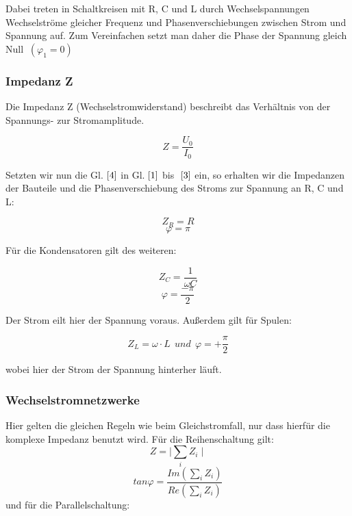 \documentclass{article}
\begin{document}
Dabei treten in Schaltkreisen mit R, C und L durch Wechselspannungen Wechselströme gleicher Frequenz und Phasenverschiebungen zwischen Strom und Spannung auf. Zum Vereinfachen setzt man daher die Phase der Spannung gleich Null \(\ (\varphi _{1}=0)\) \\

\subsubsection{Impedanz Z}
Die Impedanz Z (Wechselstromwiderstand) beschreibt das Verhältnis von der Spannungs- zur Stromamplitude.

\begin{equation}
\label{5}
Z=\frac{U_{0}}{I_{0}}
\end{equation}

Setzten wir nun die Gl.\(\ \eqref{4}\) in Gl.\(\ \eqref{1}\) bis \(\ \eqref{3}\) ein, so erhalten wir die Impedanzen der Bauteile und die Phasenverschiebung des Stroms zur Spannung an R, C und L:

\begin{equation}
Z_{R}=R
\end{equation}
\begin{equation}
\varphi = \pi
\end{equation}

Für die Kondensatoren gilt des weiteren:

\begin{equation}
Z_{C}=\frac{1}{\omega C}
\end{equation}
\begin{equation}
\varphi=\frac{-\pi }{2}
\end{equation}

Der Strom eilt hier der Spannung voraus. Außerdem gilt für Spulen:

\begin{equation}
Z_{L}=\omega \cdot L\ \ und \ \ \varphi =+\frac{\pi }{2}
\end{equation}

wobei hier der Strom der Spannung hinterher läuft.

\subsubsection{Wechselstromnetzwerke}
Hier gelten die gleichen Regeln wie beim Gleichstromfall, nur dass hierfür die komplexe Impedanz benutzt wird.
Für die Reihenschaltung gilt:
\begin{equation}
Z=\mid{ \sum \limits_{i} Z_i} \mid
\end{equation}
\begin{equation}
tan \varphi ={\frac{Im( \sum \limits_{i} Z_{i})}{Re(\sum \limits_{i} Z_{i})}}
\end{equation}
und für die Parallelschaltung:
\end{document}
